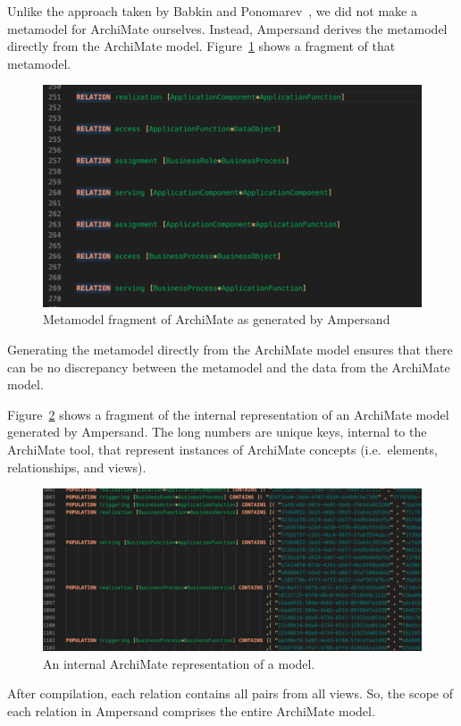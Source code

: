 \documentclass[sn-vancouver]{sn-jnl}%
\theoremstyle{thmstyleone}%
\theoremstyle{thmstyletwo}%
\theoremstyle{thmstylethree}%
\begin{document}
Unlike the approach taken by Babkin and Ponomarev~\cite{babkin2017analysis}, we did not make a metamodel for ArchiMate ourselves.
Instead, Ampersand derives the metamodel directly from the ArchiMate model.
Figure~\ref{meta} shows a fragment of that metamodel.
\begin{figure}[b]
 \centering
\includegraphics[clip=true, scale=0.5]{MetamodelArchiMate generated by ArchiChecker}
\caption{Metamodel fragment of ArchiMate as generated by Ampersand}
\label{meta}   %
\end{figure}
Generating the metamodel directly from the ArchiMate model ensures that there can be no discrepancy between the metamodel and the data from the ArchiMate model.

Figure~\ref{populated} shows a fragment of the internal representation of an ArchiMate model generated by Ampersand.
The long numbers are unique keys, internal to the ArchiMate tool, that represent instances of ArchiMate concepts (i.e.\ elements, relationships, and views).
\begin{figure}[b]
 \centering
\includegraphics[clip=true, scale=0.4]{Populated model}
\caption{An internal ArchiMate representation of a model.}
\label{populated}   %
\end{figure}
After compilation, each relation contains all pairs from all views.
So, the scope of each relation in Ampersand comprises the entire ArchiMate model.
\end{document}
